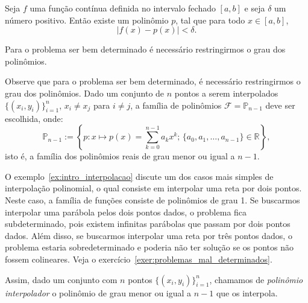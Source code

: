 \begin{teo}[Weierstrass]Seja $f$ uma função contínua definida no intervalo fechado $[a,b]$ e seja $\delta$ um número positivo. Então existe um polinômio $p$, tal que para todo $x\in[a,b]$,
	\begin{equation*}
	|f(x)-p(x)|<\delta.
	\end{equation*}
\end{teo}

Para o problema ser bem determinado é necessário restringirmos o grau dos polinômios. 

Observe que para o problema ser bem determinado, é necessário restringirmos o grau dos polinômios. Dado um conjunto de $n$ pontos a serem interpolados $\{(x_i,y_i)\}_{i=1}^{n}$, $x_i\neq x_j$ para $i\neq j$, a família de polinômios $\mathcal{F} = \mathbb{P}_{n-1}$ deve ser escolhida, onde:
\begin{equation*}
  \mathbb{P}_{n-1} := \left\{p : x\mapsto p(x) = \sum_{k=0}^{n-1}a_kx^k ;\, \{a_0,a_1,\ldots,a_{n-1}\}\in\mathbb{R}\right\},
\end{equation*}
isto é, a família dos polinômios reais de grau menor ou igual a $n-1$.

O exemplo~\ref{ex:intro_interpolacao} discute um dos casos mais simples de interpolação polinomial, o qual consiste em interpolar uma reta por dois pontos. Neste caso, a família de funções consiste de polinômios de grau 1. Se buscarmos interpolar uma parábola pelos dois pontos dados, o problema fica subdeterminado, pois existem infinitas parábolas que passam por dois pontos dados. Além disso, se buscarmos interpolar uma reta por três pontos dados, o problema estaria sobredeterminado e poderia não ter solução se os pontos não fossem colineares. Veja o exercício~\ref{exer:problemas_mal_determinados}.

Assim, dado um conjunto com $n$ pontos $\{(x_i,y_i)\}_{i=1}^{n}$, chamamos de \emph{polinômio interpolador} o polinômio de grau menor ou igual a $n-1$ que os interpola.


